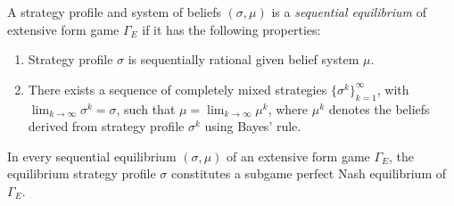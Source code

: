 \begin{defn}
    A strategy profile and system of beliefs $(\sigma, \mu)$ is a \emph{sequential equilibrium} of extensive form game $\Gamma_E$ if it has the following properties:
    \begin{enumerate}
        \item Strategy profile $\sigma$ is sequentially rational given belief system $\mu$.
        \item There exists a sequence of completely mixed strategies $\{\sigma^k\}_{k = 1}^\infty$, with $\lim_{k \rightarrow \infty} \sigma^k = \sigma$, such that $\mu = \lim_{k \rightarrow \infty} \mu^k$, where $\mu^k$ denotes the beliefs derived from strategy profile $\sigma^k$ using Bayes' rule.
    \end{enumerate}
\end{defn}

\begin{prop}
    In every sequential equilibrium $(\sigma, \mu)$ of an extensive form game $\Gamma_E$, the equilibrium strategy profile $\sigma$ constitutes a subgame perfect Nash equilibrium of $\Gamma_E$.
\end{prop}
